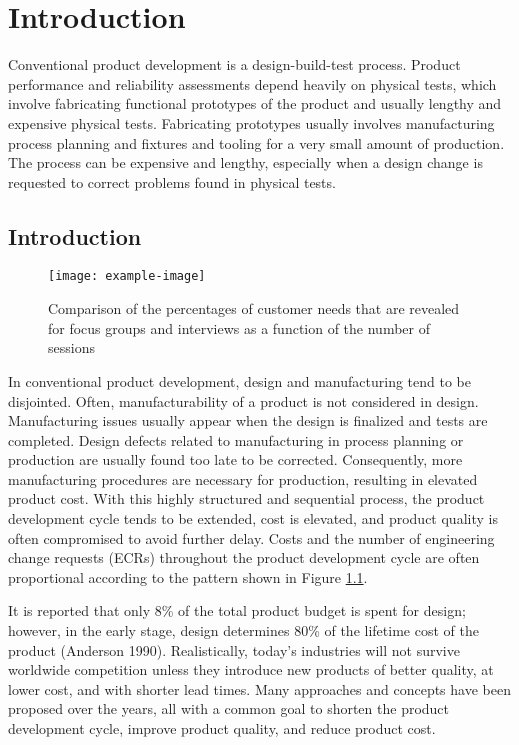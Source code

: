 
\chapter{Introduction}

Conventional product development is a design-build-test process.
Product performance and reliability assessments depend heavily on physical tests,
which involve fabricating functional prototypes of the product and usually lengthy and expensive physical tests.
Fabricating prototypes usually involves manufacturing process planning and fixtures and tooling
for a very small amount of production.
The process can be expensive and lengthy,
especially when a design change is requested to correct problems found in physical tests.

\section{Introduction}

\begin{figure}[htbp]
  \centering
  \texttt{[image: example-image]}
  \caption{Comparison of the percentages of customer needs that are revealed for focus groups and interviews as a function of the number of sessions}\label{fig:a}
\end{figure}

In conventional product development, design and manufacturing tend to be disjointed.
Often, manufacturability of a product is not considered in design.
Manufacturing issues usually appear when the design is finalized and tests are completed.
Design defects related to manufacturing in process planning or production
are usually found too late to be corrected. Consequently, more manufacturing
procedures are necessary for production, resulting in elevated product cost\cite{cite1}.
With this highly structured and sequential process, the product development cycle tends
to be extended, cost is elevated, and product quality is often compromised to
avoid further delay. Costs and the number of engineering change requests (ECRs)
throughout the product development cycle are often proportional according to the pattern
shown in Figure \ref{fig:a}.

It is reported that only 8\% of the total product budget is spent for design; however, in
the early stage, design determines 80\% of the lifetime cost of the product (Anderson 1990).
Realistically, today's industries will not survive worldwide competition unless they introduce
new products of better quality, at lower cost, and with shorter lead times. Many approaches
and concepts have been proposed over the years, all with a common goal to shorten
the product development cycle, improve product quality, and reduce product cost\parencite{cite2}.


